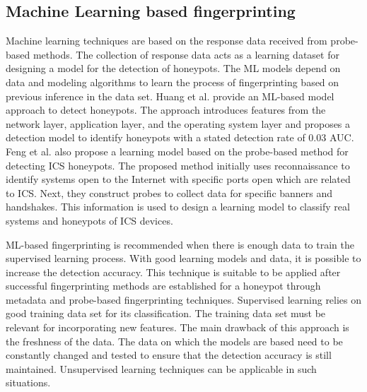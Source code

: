 \subsection{Machine Learning based fingerprinting}
Machine learning techniques are based on the response data received from probe-based methods. The collection of response data acts as a learning dataset for designing a model for the detection of honeypots. The ML models depend on data and modeling algorithms to learn the process of fingerprinting based on previous inference in the data set. Huang et al. \cite{huang} provide an ML-based model approach to detect honeypots. The approach introduces features from the network layer, application layer, and the operating system layer and proposes a detection model to identify honeypots with a stated detection rate of 0.03 AUC. Feng et al. \cite{Feng2016} also propose a learning model based on the probe-based method for detecting ICS honeypots. The proposed method initially uses reconnaissance to identify systems open to the Internet with specific ports open which are related to ICS. Next, they construct probes to collect data for specific banners and handshakes. This information is used to design a learning model to classify real systems and honeypots of ICS devices.

ML-based fingerprinting is recommended when there is enough data to train the supervised learning process. With good learning models and data, it is possible to increase the detection accuracy. This technique is suitable to be applied after successful fingerprinting methods are established for a honeypot through metadata and probe-based fingerprinting techniques. Supervised learning relies on good training data set for its classification. The training data set must be relevant for incorporating new features. The main drawback of this approach is the freshness of the data. The data on which the models are based need to be constantly changed and tested to ensure that the detection accuracy is still maintained. Unsupervised learning techniques can be applicable in such situations. 
